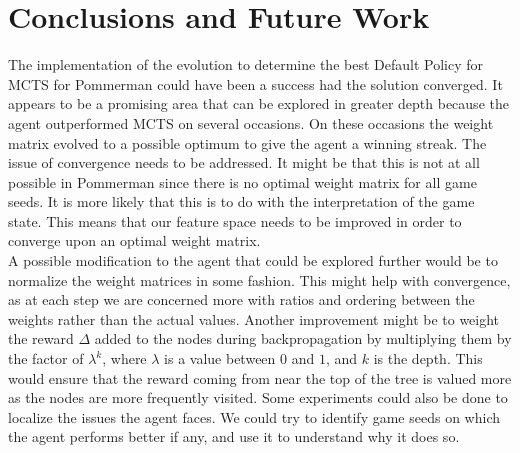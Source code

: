 \documentclass{llncs}
\begin{document}
\section{Conclusions and Future Work} \label{sec:conc}

The implementation of the evolution to determine the best Default Policy for MCTS for Pommerman could have been a success had the solution converged. It appears to be a promising area that can be explored in greater depth because the agent outperformed MCTS on several occasions. On these occasions the weight matrix evolved to a possible optimum to give the agent a winning streak. The issue of convergence needs to be addressed. It might be that this is not at all possible in Pommerman since there is no optimal weight matrix for all game seeds. It is more likely that this is to do with the interpretation of the game state. This means that our feature space needs to be improved in order to converge upon an optimal weight matrix.\\

\noindent
A possible modification to the agent that could be explored further would be to normalize the weight matrices in some fashion. This might help with convergence, as at each step we are concerned more with ratios and ordering between the weights rather than the actual values. Another improvement might be to weight the reward $\Delta$ added to the nodes during backpropagation by multiplying them by the factor of $\lambda^k$, where $\lambda$ is a value between $0$ and $1$, and $k$ is the depth. This would ensure that the reward coming from near the top of the tree is valued more as the nodes are more frequently visited. Some experiments could also be done to localize the issues the agent faces. We could try to identify game seeds on which the agent performs better if any, and use it to understand why it does so.


\pagebreak


\end{document}
